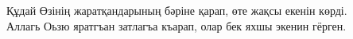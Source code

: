 \documentclass[a4paper,11pt,twocolumn]{article}
\begin{document}
\begin{table}



\centering

Құдай Өзінің жаратқандарының бәріне қарап, өте жақсы екенін көрді. \\
Аллагь Оьзю яратгъан затлагъа къарап, олар бек яхшы экенин гёрген. \\

~\\


\end{table}
\end{document}
